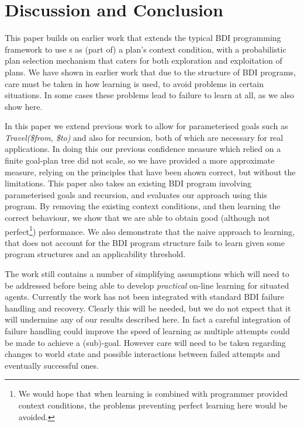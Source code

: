 \section{Discussion and Conclusion}\label{sec:discussion}

This paper builds on earlier work that extends
the typical BDI programming framework to use \dt{}s as (part of) a
plan's context condition, with a probabilistic plan selection
mechanism that caters for both exploration and exploitation of plans.
We have shown in earlier work that due to the structure of BDI
programs, care must be taken in how learning is used, to avoid
problems in certain situations. In some cases these problems lead to
failure to learn at all, as we also show here.

In this paper we extend previous work to allow for parameterised
goals such as {\it Travel(\$from, \$to)} and also for recursion, both
of which are necessary for real applications. In doing this our
previous confidence measure which relied on a finite goal-plan tree
did not scale, so we have provided a more approximate measure, relying
on the principles that have been shown correct, but without the
limitations. This paper also takes an existing BDI program involving
parameterised goals and recursion, and evaluates our approach using
this program. By removing the existing context conditions, and then
learning the correct behaviour, we show that we are able to obtain
good (although not perfect\footnote{We would hope that when learning
is combined with programmer provided context conditions, the problems
preventing perfect learning here would be avoided.}) performance. We
also demonstrate that the naive approach to learning, that does not
account for the BDI program structure fails to learn given
some program structures and an applicability threshold.

The work still contains a number of simplifying assumptions which will
need to be addressed before being able to develop {\it practical} on-line
learning for situated agents. Currently the work has not been
integrated with standard BDI failure handling and recovery. Clearly
this will be needed, but we do not expect that it will undermine any
of our results described here. In fact a careful integration of
failure handling could improve the speed of learning as multiple
attempts could be made to achieve a (sub)-goal. However care will need
to be taken regarding changes to world state and possible interactions
between failed attempts and eventually successful ones.

